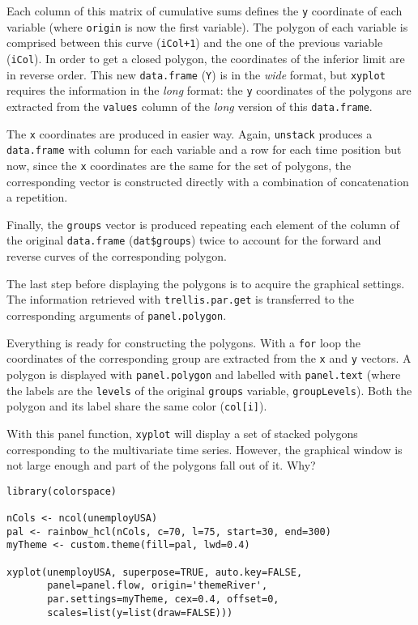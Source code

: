 Each column of this matrix of cumulative sums defines the \texttt{y}
coordinate of each variable (where \texttt{origin} is now the first
variable). The polygon of each variable is comprised between this
curve (\texttt{iCol+1}) and the one of the previous variable (\texttt{iCol}). In
order to get a closed polygon, the coordinates of the inferior
limit are in reverse order. This new \texttt{data.frame} (\texttt{Y}) is in the
\emph{wide} format, but \texttt{xyplot} requires the information in the \emph{long}
format: the \texttt{y} coordinates of the polygons are extracted from the
\texttt{values} column of the \emph{long} version of this \texttt{data.frame}.

The \texttt{x} coordinates are produced in easier way. Again, \texttt{unstack}
produces a \texttt{data.frame} with column for each variable and a row
for each time position but now, since the \texttt{x} coordinates are the same
for the set of polygons, the corresponding vector is constructed
directly with a combination of concatenation a repetition.

Finally, the \texttt{groups} vector is produced repeating each element of
the column of the original \texttt{data.frame} (\texttt{dat\$groups}) twice to
account for the forward and reverse curves of the corresponding
polygon.

The last step before displaying the polygons is to acquire the
graphical settings. The information retrieved with
\texttt{trellis.par.get} is transferred to the corresponding arguments of
\texttt{panel.polygon}.

Everything is ready for constructing the polygons. With a \texttt{for}
loop the coordinates of the corresponding group are extracted from
the \texttt{x} and \texttt{y} vectors. A polygon is displayed with
\texttt{panel.polygon} and labelled with \texttt{panel.text} (where the labels
are the \texttt{levels} of the original \texttt{groups} variable,
\texttt{groupLevels}). Both the polygon and its label share the same
color (\texttt{col[i]}).

With this panel function, \texttt{xyplot} will display a set of stacked
polygons corresponding to the multivariate time series. However,
the graphical window is not large enough and part of the polygons
fall out of it. Why?



\lstset{language=R}
\begin{lstlisting}
library(colorspace)

nCols <- ncol(unemployUSA)
pal <- rainbow_hcl(nCols, c=70, l=75, start=30, end=300)
myTheme <- custom.theme(fill=pal, lwd=0.4)

xyplot(unemployUSA, superpose=TRUE, auto.key=FALSE,
       panel=panel.flow, origin='themeRiver',
       par.settings=myTheme, cex=0.4, offset=0,
       scales=list(y=list(draw=FALSE)))
\end{lstlisting}

